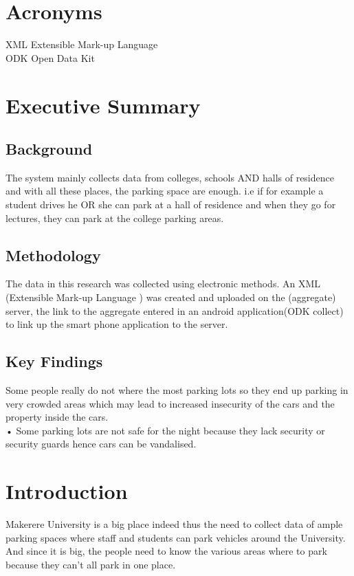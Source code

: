 \documentclass[18pt, a4paper]{article}
\begin{document}
			\section{Acronyms}
XML		Extensible Mark-up Language \\
ODK		Open Data Kit\\			


			\section {Executive Summary}
				\subsection{Background}
The system mainly collects data from colleges, schools AND halls of residence and with all these places, the parking space are enough. i.e if for example a student drives he OR she can park at a hall of residence and when they go for lectures, they can park at the college parking areas.

\subsection{Methodology}

The data in this research was collected using electronic methods. An XML (Extensible Mark-up Language ) was created and uploaded on the (aggregate) server, the link to the aggregate entered in an android application(ODK collect) to link up the smart phone application to the server.

				\subsection{Key Findings}
Some people really do not where the most parking lots so they end up parking in very crowded areas which may lead to increased insecurity of the cars and the property inside the cars.\\

•	Some parking lots are not safe for the night because they lack security or security guards hence cars can be vandalised.\\



				\section{Introduction}

Makerere University is a big place indeed thus the need to collect data of ample parking spaces where staff and students can park vehicles around the University. And since it is big, the people need to know the various areas where to park because they can’t all park in one place.\\
\end{document}
